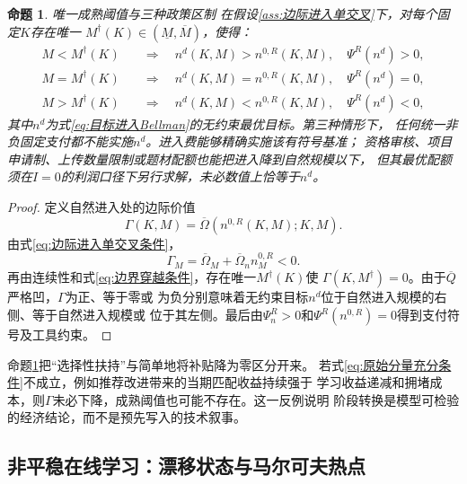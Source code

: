 \documentclass[UTF8, a4paper, 12pt, fontset=fandol]{ctexart}
\newtheorem{proposition}[theorem]{命题}
\theoremstyle{definition}
\theoremstyle{remark}
\begin{document}
\begin{proposition}{唯一成熟阈值与三种政策区制}
  \label{prop:推荐资本与补贴}
  在假设\ref{ass:边际进入单交叉}下，对每个固定$K$存在唯一
  $M^\dagger(K)\in(\underline M,\overline M)$，使得：
  \begin{align*}
    M<M^\dagger(K)
    &\quad\Longrightarrow\quad
    n^d(K,M)>n^{0,R}(K,M),\quad \Psi^R(n^d)>0,\\
    M=M^\dagger(K)
    &\quad\Longrightarrow\quad
    n^d(K,M)=n^{0,R}(K,M),\quad \Psi^R(n^d)=0,\\
    M>M^\dagger(K)
    &\quad\Longrightarrow\quad
    n^d(K,M)<n^{0,R}(K,M),\quad \Psi^R(n^d)<0,
  \end{align*}
  其中$n^d$为式\eqref{eq:目标进入Bellman}的无约束最优目标。第三种情形下，
  任何统一非负固定支付都不能实施$n^d$。进入费能够精确实施该有符号基准；
  资格审核、项目申请制、上传数量限制或题材配额也能把进入降到自然规模以下，
  但其最优配额须在$I=0$的利润口径下另行求解，未必数值上恰等于$n^d$。
\end{proposition}

\begin{proof}
  定义自然进入处的边际价值
  \begin{equation*}
    \Gamma(K,M)
    =\overline\Omega\!\left(n^{0,R}(K,M);K,M\right).
  \end{equation*}
  由式\eqref{eq:边际进入单交叉条件}，
  \begin{equation*}
    \Gamma_M
    =\overline\Omega_M
    +\overline\Omega_n n_M^{0,R}<0.
  \end{equation*}
  再由连续性和式\eqref{eq:边界穿越条件}，存在唯一$M^\dagger(K)$使
  $\Gamma(K,M^\dagger)=0$。由于$\overline Q$严格凹，$\Gamma$为正、等于零或
  为负分别意味着无约束目标$n^d$位于自然进入规模的右侧、等于自然进入规模或
  位于其左侧。最后由$\Psi_n^R>0$和$\Psi^R(n^{0,R})=0$得到支付符号及工具约束。
\end{proof}

命题\ref{prop:推荐资本与补贴}把“选择性扶持”与简单地将补贴降为零区分开来。
若式\eqref{eq:原始分量充分条件}不成立，例如推荐改进带来的当期匹配收益持续强于
学习收益递减和拥堵成本，则$\Gamma$未必下降，成熟阈值也可能不存在。这一反例说明
阶段转换是模型可检验的经济结论，而不是预先写入的技术叙事。

\subsection{非平稳在线学习：漂移状态与马尔可夫热点}
\label{sec:bayesian-extension}
\end{document}
